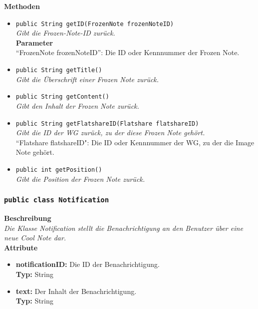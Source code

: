 	\textbf{Methoden}
	\begin{itemize}
		\item\texttt{{public String getID(FrozenNote frozenNoteID)}}\\
		\textit{Gibt die Frozen-Note-ID zurück.}\\
		\textbf{Parameter}\\
		“FrozenNote frozenNoteID”: Die ID oder Kennnummer der Frozen Note.\\
		
		\item\texttt{{public String getTitle()}}\\
		\textit{Gibt die Überschrift einer Frozen Note zurück.}\\
		
		\item\texttt{{public String getContent()}}\\
		\textit{Gibt den Inhalt der Frozen Note zurück.}\\
		
		\item\texttt{{public String getFlatshareID(Flatshare flatshareID)}}\\
		\textit{Gibt die ID der WG zurück, zu der diese Frozen Note gehört.}\\
		``Flatshare flatshareID": Die ID oder Kennnummer der WG, zu der die Image Note gehört.
		
		\item\texttt{{public int getPosition()}}\\
		\textit{Gibt die Position der Frozen Note zurück.}\\
	\end{itemize}

\subsubsection{\texttt{public class Notification}}

	\textbf{Beschreibung} \\
	\textit{Die Klasse Notification stellt die Benachrichtigung an den Benutzer über eine neue Cool Note dar.} \\
	
	\textbf{Attribute}
	\begin{itemize}
		\item \textbf{notificationID:} Die ID der Benachrichtigung. \\
		\textbf{Typ:} String
		\item \textbf{text:} Der Inhalt der Benachrichtigung. \\
		\textbf{Typ:} String
	\end{itemize}
	
